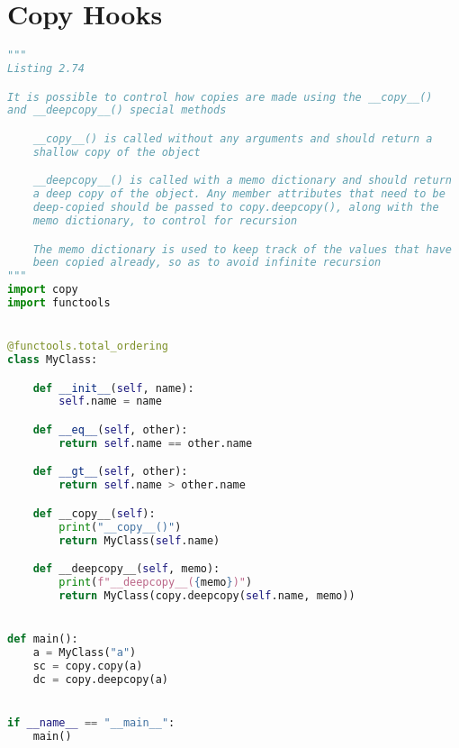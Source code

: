 \documentclass[a4paper,landscape]{report}
\begin{document}
\section{Copy Hooks}
\begin{lstlisting}[language=Python]
"""
Listing 2.74

It is possible to control how copies are made using the __copy__()
and __deepcopy__() special methods

    __copy__() is called without any arguments and should return a
    shallow copy of the object

    __deepcopy__() is called with a memo dictionary and should return
    a deep copy of the object. Any member attributes that need to be
    deep-copied should be passed to copy.deepcopy(), along with the
    memo dictionary, to control for recursion

    The memo dictionary is used to keep track of the values that have
    been copied already, so as to avoid infinite recursion
"""
import copy
import functools


@functools.total_ordering
class MyClass:

    def __init__(self, name):
        self.name = name

    def __eq__(self, other):
        return self.name == other.name

    def __gt__(self, other):
        return self.name > other.name

    def __copy__(self):
        print("__copy__()")
        return MyClass(self.name)

    def __deepcopy__(self, memo):
        print(f"__deepcopy__({memo})")
        return MyClass(copy.deepcopy(self.name, memo))


def main():
    a = MyClass("a")
    sc = copy.copy(a)
    dc = copy.deepcopy(a)


if __name__ == "__main__":
    main()

\end{lstlisting}
\end{document}
